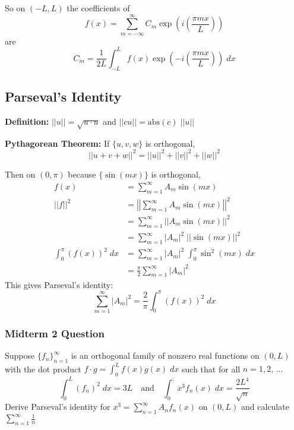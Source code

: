 \documentclass[10pt]{article}
\begin{document}
So on $(-L, L)$ the coefficients of 
\[f(x) = \sum_{m=-\infty}^\infty C_m \exp(i(\frac{\pi mx}{L}))\]
are 
\[C_m = \frac{1}{2L}\int_{-L}^L f(x)\exp(-i(\frac{\pi mx}{L}))\; dx\]

\subsection{Parseval's Identity}
\textbf{Definition:} $||u|| = \sqrt{u \cdot u}$ and $||cu|| = \text{abs}(c) \; ||u||$

\textbf{Pythagorean Theorem:} If $\{u, v, w\}$ is orthogonal,
\[||u + v + w||^2 = ||u||^2 + ||v||^2 + ||w||^2\]

Then on $(0, \pi)$ because $\{\sin(mx)\}$ is orthogonal, 
\begin{align*}
    f(x) &= \sum_{m=1}^\infty A_m \sin(mx)\\
    ||f||^2 &= \left|\left|\sum_{m=1}^\infty A_m \sin(mx)\right|\right|^2\\
    &= \sum_{m=1}^\infty ||A_m \sin(mx)||^2\\
    &= \sum_{m=1}^\infty |A_m|^2\; ||\sin(mx)||^2\\
    \int_0^\pi (f(x))^2\; dx &= \sum_{m=1}^\infty |A_m|^2\; \int_0^\pi\sin^2(mx)\; dx\\
    &= \frac{\pi}{2}\sum_{m=1}^\infty |A_m|^2\
\end{align*}
This gives Parseval's identity:
\[\sum_{m=1}^\infty |A_m|^2= \frac{2}{\pi} \int_0^\pi (f(x))^2\; dx\]

\subsubsection{Midterm 2 Question} 
Suppose $\{f_n\}_{n=1}^\infty$ is an orthogonal family of nonzero real functions on $(0, L)$ with the dot product $f\cdot g =\int_0^L f(x)g(x)\;dx$ such that for all $n = 1, 2, \, ...$ 
\[\int_0^L(f_n)^2\; dx = 3L \quad \text{and} \quad \int_0^: x^3 f_n(x)\; dx = \frac{2L^4}{\sqrt{n}}\] 
Derive Parseval's identity for $x^3=\sum_{n=1}^\infty A_n f_n(x)$ on $(0, L)$ and calculate $\sum_{n=1}^\infty \frac{1}{n}$
\end{document}
